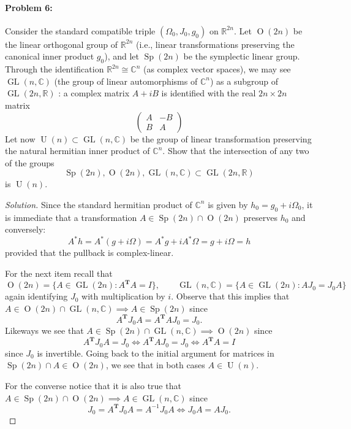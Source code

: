  \paragraph{Problem 6:} Consider the standard compatible triple $(\Omega_0,J_0,g_0)$ on $\mathbb{R}^{2n}$. Let $\operatorname{O}(2n)$ be the linear orthogonal group of $\mathbb{R}^{2n}$ (i.e., linear transformations preserving the canonical inner product $g_0$), and let $\operatorname{Sp}(2n)$ be the symplectic linear group. Through the identification $\mathbb{R}^{2n}\cong \mathbb{C}^{n}$ (as complex vector spaces), we may see $\operatorname{GL}(n,\mathbb{C})$ (the group of linear automorphisms of $\mathbb{C}^{n}$) as a subgroup of $\operatorname{GL}(2n,\mathbb{R})$ : a complex matrix $A+iB$ is identified with the real $2n\times 2n$ matrix
 \[\begin{pmatrix}A&-B\\B&A\end{pmatrix}\]
Let now $\operatorname{U}(n)\subset\operatorname{GL}(n,\mathbb{C})$ be the group of linear transformation preserving the natural hermitian inner product of $\mathbb{C}^{n}$. Show that the intersection of any two of the groups
\[\operatorname{Sp}(2n),\operatorname{O}(2n),\operatorname{GL}(n,\mathbb{C})\subset\operatorname{GL}(2n,\mathbb{R})\]
is $\operatorname{U}(n)$.

\begin{proof}[Solution]\leavevmode

	Since the standard hermitian product of $\mathbb{C}^{n}$ is given by $h_0=g_0+i\Omega_0$, it is immediate that a transformation $A\in\operatorname{Sp}(2n)\cap \operatorname{O}(2n)$ preserves $h_0$ and conversely:
	\[A^*h=A^*(g+i\Omega)=A^*g+iA^*\Omega=g+i\Omega=h\]
	provided that the pullback is complex-linear.

	For the next item recall that
	\[\operatorname{O}(2n)=\{A\in\operatorname{GL}(2n):A^{\mathbf{T}}A=I\},\qquad \operatorname{GL}(n,\mathbb{C})=\{A\in\operatorname{GL}(2n):AJ_0=J_0A\}\]
	again identifying $J_0$ with multiplication by $i$. Observe that this implies that $A\in\operatorname{O}(2n)\cap \operatorname{GL}(n,\mathbb{C})\implies  A\in\operatorname{Sp}(2n)$ since
	\[A^{\mathbf{T}}J_0A=A^{\mathbf{T}}A J_0=J_0.\]
	Likeways we see that $A\in\operatorname{Sp}(2n)\cap \operatorname{GL}(n,\mathbb{C})\implies \operatorname{O}(2n)$ since
	\[A^{\mathbf{T}}J_0A=J_0\iff A^{\mathbf{T}}A J_0=J_0\iff A^{\mathbf{T}}A=I\]
	since $J_0$ is invertible. Going back to the initial argument for matrices in $\operatorname{Sp}(2n)\cap A\in\operatorname{O}(2n)$, we see that in both cases $A\in\operatorname{U}(n)$.

	For the converse notice that it is also true that $A\in\operatorname{Sp}(2n)\cap \operatorname{O}(2n)\implies A\in\operatorname{GL}(n,\mathbb{C})$ since
	\[J_0=A^{\mathbf{T}}J_0A=A^{-1} J_0A\iff J_0A=A J_0.\]
\end{proof}

